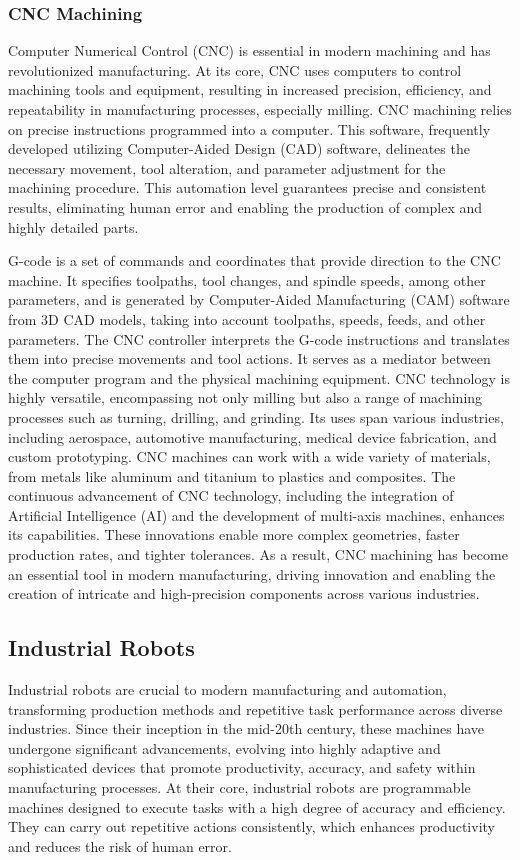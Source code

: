 \documentclass[ZLstudentexpose%
              ,optBiber%
              ,optEnglish%
              ,10pt
              ]{ZLlatex}%
\begin{document}
\subsubsection{CNC Machining}
Computer Numerical Control (CNC) is essential in modern machining and has revolutionized manufacturing. At its core, CNC uses computers to control machining tools and equipment, resulting in increased precision, efficiency, and repeatability in manufacturing processes, especially milling. CNC machining relies on precise instructions programmed into a computer. This software, frequently developed utilizing Computer-Aided Design (CAD) software, delineates the necessary movement, tool alteration, and parameter adjustment for the machining procedure. This automation level guarantees precise and consistent results, eliminating human error and enabling the production of complex and highly detailed parts.

G-code is a set of commands and coordinates that provide direction to the CNC machine. It specifies toolpaths, tool changes, and spindle speeds, among other parameters, and is generated by Computer-Aided Manufacturing (CAM) software from 3D CAD models, taking into account toolpaths, speeds, feeds, and other parameters.
The CNC controller interprets the G-code instructions and translates them into precise movements and tool actions. It serves as a mediator between the computer program and the physical machining equipment. CNC technology is highly versatile, encompassing not only milling but also a range of machining processes such as turning, drilling, and grinding. Its uses span various industries, including aerospace, automotive manufacturing, medical device fabrication, and custom prototyping. CNC machines can work with a wide variety of materials, from metals like aluminum and titanium to plastics and composites.
The continuous advancement of CNC technology, including the integration of Artificial Intelligence (AI) and the development of multi-axis machines, enhances its capabilities.  These innovations enable more complex geometries, faster production rates, and tighter tolerances. As a result, CNC machining has become an essential tool in modern manufacturing, driving innovation and enabling the creation of intricate and high-precision components across various industries.
\subsection{Industrial Robots}
Industrial robots are crucial to modern manufacturing and automation, transforming production methods and repetitive task performance across diverse industries. Since their inception in the mid-20th century, these machines have undergone significant advancements, evolving into highly adaptive and sophisticated devices that promote productivity, accuracy, and safety within manufacturing processes.
At their core, industrial robots are programmable machines designed to execute tasks with a high degree of accuracy and efficiency. They can carry out repetitive actions consistently, which enhances productivity and reduces the risk of human error. 
\end{document}
